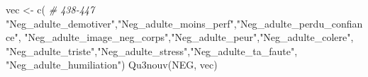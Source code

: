 \documentclass[
]{article}
\newenvironment{Shaded}{\begin{snugshade}}{\end{snugshade}}
\newcommand{\CommentTok}[1]{\textcolor[rgb]{0.56,0.35,0.01}{\textit{#1}}}
\newcommand{\FunctionTok}[1]{\textcolor[rgb]{0.00,0.00,0.00}{#1}}
\newcommand{\NormalTok}[1]{#1}
\newcommand{\OtherTok}[1]{\textcolor[rgb]{0.56,0.35,0.01}{#1}}
\newcommand{\StringTok}[1]{\textcolor[rgb]{0.31,0.60,0.02}{#1}}
\begin{document}
\begin{Shaded}
\begin{Highlighting}[]
\NormalTok{vec }\OtherTok{\textless{}{-}} \FunctionTok{c}\NormalTok{(  }\CommentTok{\# 438{-}447}
  \StringTok{"Neg\_adulte\_demotiver"}\NormalTok{,}\StringTok{"Neg\_adulte\_moins\_perf"}\NormalTok{,}\StringTok{"Neg\_adulte\_perdu\_confiance"}\NormalTok{,}
  \StringTok{"Neg\_adulte\_image\_neg\_corps"}\NormalTok{,}\StringTok{"Neg\_adulte\_peur"}\NormalTok{,}\StringTok{"Neg\_adulte\_colere"}\NormalTok{,}
  \StringTok{"Neg\_adulte\_triste"}\NormalTok{,}\StringTok{"Neg\_adulte\_stress"}\NormalTok{,}\StringTok{"Neg\_adulte\_ta\_faute"}\NormalTok{,}
  \StringTok{"Neg\_adulte\_humiliation"}\NormalTok{)}
\FunctionTok{Qu3nouv}\NormalTok{(NEG, vec)}
\end{Highlighting}
\end{Shaded}
\end{document}
